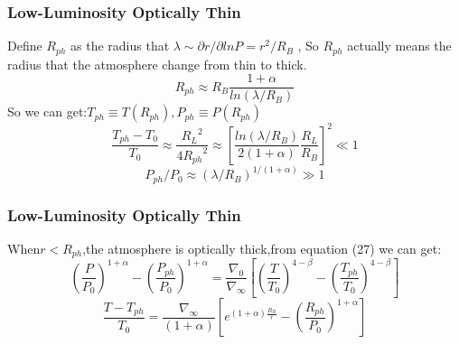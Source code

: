 \documentclass{beamer}
\begin{document}
\begin{frame}
\frametitle{Low-Luminosity Optically Thin}
Define $R_{ph}$ as the radius that $\lambda \sim \partial r/\partial ln P=r^2/R_B$ , So $R_{ph}$ actually means the radius that the atmosphere change from thin to thick.
\begin{equation}
R_{ph} \approx R_B \frac{1+\alpha}{ln(\lambda /R_B)}
\end{equation}
So we can get:$T_{ph} \equiv T(R_{ph}),P_{ph} \equiv P(R_{ph})$
\begin{equation}
\frac{T_{ph}-T_0}{T_0} \approx \frac{{R_L}^2}{4 {R_{ph}}^2} \approx  [\frac{ln(\lambda/R_B)}{2(1+\alpha)}\frac{R_L}{R_B}]^2 \ll 1
\end{equation}
\begin{equation}
P_{ph}/P_0 \approx (\lambda/R_B)^{1/(1+\alpha)} \gg 1
\end{equation}
\end{frame}

\begin{frame}
\frametitle{Low-Luminosity Optically Thin}
When$r< R_{ph}$,the atmosphere is optically thick,from equation (27) we can get:
\begin{equation}
(\frac{P}{P_0})^{1+\alpha}-(\frac{P_{ph}}{P_0})^{1+\alpha}=\frac{\nabla_0}{\nabla_{\infty}}
[(\frac{T}{T_0})^{4-\beta}-(\frac{T_{ph}}{T_0})^{4-\beta}]
\end{equation}
\begin{equation}
\frac{T-T_{ph}}{T_0}=\frac{\nabla_{\infty}}{(1+\alpha)}
[e^{(1+\alpha)\frac{R_B}{r}}-(\frac{R_{ph}}{P_0})^{1+\alpha}]
\end{equation}
\end{frame}
\end{document}
